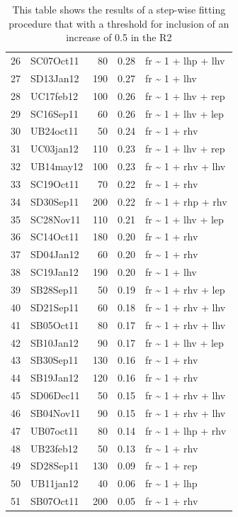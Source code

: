 \documentclass[]{article}
\begin{document}
\begin{table}[ht]
\begin{tabular}{rlrrl}
  26 & SC07Oct11 &  80 & 0.28 & fr \~{} 1 + lhp + lhv \\ 
  27 & SD13Jan12 & 190 & 0.27 & fr \~{} 1 + lhv \\ 
  28 & UC17feb12 & 100 & 0.26 & fr \~{} 1 + lhv + rep \\ 
  29 & SC16Sep11 &  60 & 0.26 & fr \~{} 1 + lhv + lep \\ 
  30 & UB24oct11 &  50 & 0.24 & fr \~{} 1 + rhv \\ 
  31 & UC03jan12 & 110 & 0.23 & fr \~{} 1 + lhv + rep \\ 
  32 & UB14may12 & 100 & 0.23 & fr \~{} 1 + rhv + lhv \\ 
  33 & SC19Oct11 &  70 & 0.22 & fr \~{} 1 + rhv \\ 
  34 & SD30Sep11 & 200 & 0.22 & fr \~{} 1 + rhp + rhv \\ 
  35 & SC28Nov11 & 110 & 0.21 & fr \~{} 1 + lhv + lep \\ 
  36 & SC14Oct11 & 180 & 0.20 & fr \~{} 1 + rhv \\ 
  37 & SD04Jan12 &  60 & 0.20 & fr \~{} 1 + rhv \\ 
  38 & SC19Jan12 & 190 & 0.20 & fr \~{} 1 + lhv \\ 
  39 & SB28Sep11 &  50 & 0.19 & fr \~{} 1 + rhv + lep \\ 
  40 & SD21Sep11 &  60 & 0.18 & fr \~{} 1 + rhv + lhv \\ 
  41 & SB05Oct11 &  80 & 0.17 & fr \~{} 1 + rhv + lhv \\ 
  42 & SB10Jan12 &  90 & 0.17 & fr \~{} 1 + lhv + lep \\ 
  43 & SB30Sep11 & 130 & 0.16 & fr \~{} 1 + rhv \\ 
  44 & SB19Jan12 & 120 & 0.16 & fr \~{} 1 + rhv \\ 
  45 & SD06Dec11 &  50 & 0.15 & fr \~{} 1 + rhv + lhv \\ 
  46 & SB04Nov11 &  90 & 0.15 & fr \~{} 1 + rhv + lhv \\ 
  47 & UB07oct11 &  80 & 0.14 & fr \~{} 1 + lhp + rhv \\ 
  48 & UB23feb12 &  50 & 0.13 & fr \~{} 1 + rhv \\ 
  49 & SD28Sep11 & 130 & 0.09 & fr \~{} 1 + rep \\ 
  50 & UB11jan12 &  40 & 0.06 & fr \~{} 1 + lhp \\ 
  51 & SB07Oct11 & 200 & 0.05 & fr \~{} 1 + rhv \\ 
   \hline
\end{tabular}
\caption{This table shows the results of a step-wise fitting procedure that with a threshold for inclusion of an increase of 0.5 in the R2} 
\end{table}
\end{document}
